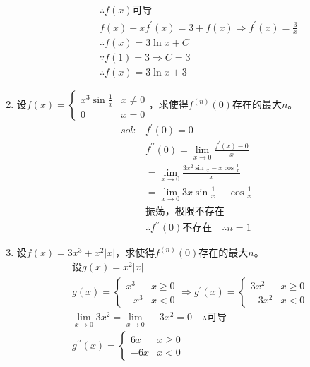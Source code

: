 \begin{enumerate}[{例}1.]
\begin{enumerate}[$1^\circ$]
\begin{align*}
                    &\therefore f(x)\mbox{可导}\\
                    &f(x)+xf^{\prime}(x)=3+f(x)\Rightarrow f^{\prime}(x)=\frac{3}{x}\\
                    &\therefore f(x)=3\ln x+C\\
                    &\because f(1)=3\Rightarrow C=3\\
                    &\therefore f(x)=3\ln x+3
                \end{align*}
        \end{enumerate}
    \item 设$f(x)=\begin{cases}x^3 \sin \frac{1}{x} & x\neq 0\\
                                0 & x=0
                \end{cases}$，求使得$f^{(n)}(0)$存在的最大$n$。
        \begin{align*}
            sol:&f^{\prime}(0)=0\\
                &f^{\prime\prime}(0)=\lim_{x\to 0}\frac{f^{\prime}(x)-0}{x}\\
                &=\lim_{x\to 0}\frac{3x^2\sin \frac{1}{x}-x\cos\frac{1}{x}}{x}\\
                &=\lim_{x\to 0}3x\sin\frac{1}{x}-\cos\frac{1}{x}\\
                &\mbox{振荡，极限不存在}\\
                &\therefore f^{\prime\prime}(0)\mbox{不存在}\quad\therefore n=1
        \end{align*}
    \item 设$f(x)=3x^3 + x^2 \left|x\right|$，求使得$f^{(n)}(0)$存在的最大$n$。
        \begin{align*}
            &\mbox{设}g(x)=x^2\left|x\right|\\
            &g(x)=\begin{cases}x^3 & x\geq 0\\ -x^3 & x<0\end{cases}\Rightarrow g^{\prime}(x)=\begin{cases}3x^2 & x\geq 0\\ -3x^2 & x<0\end{cases}\\
            &\lim_{x\to 0}3x^2=\lim_{x\to 0}-3x^2=0\quad\therefore \mbox{可导}\\
            &g^{\prime\prime}(x)=\begin{cases}6x & x\geq 0\\ -6x & x<0\end{cases}\\

\end{align*}
\end{enumerate}
